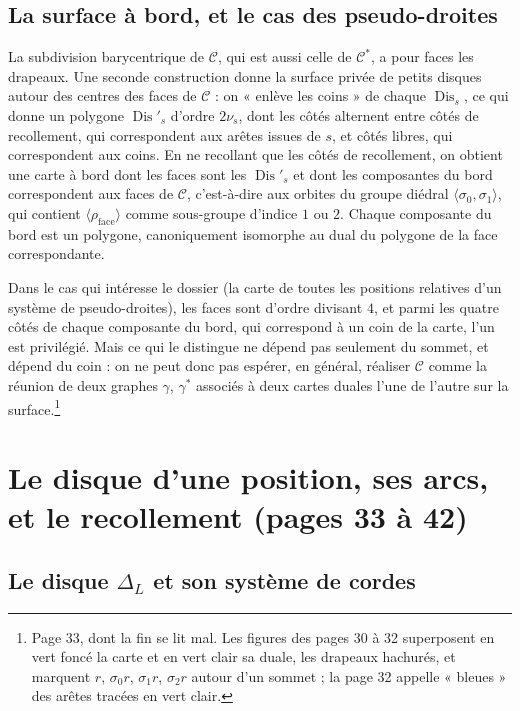 \documentclass[11pt,a4paper]{article}
\begin{document}
\subsection*{La surface à bord, et le cas des pseudo-droites}

La subdivision barycentrique de $\mathcal{C}$, qui est aussi celle de
$\mathcal{C}^{*}$, a pour faces les drapeaux. Une seconde construction donne la
surface privée de petits disques autour des centres des faces de $\mathcal{C}$ :
on « enlève les coins » de chaque $\operatorname{Dis}_s$, ce qui donne un
polygone $\operatorname{Dis}'_s$ d'ordre $2\nu_s$, dont les côtés alternent
entre côtés de recollement, qui correspondent aux arêtes issues de $s$, et côtés
libres, qui correspondent aux coins. En ne recollant que les côtés de
recollement, on obtient une carte à bord dont les faces sont les
$\operatorname{Dis}'_s$ et dont les composantes du bord correspondent aux faces
de $\mathcal{C}$, c'est-à-dire aux orbites du groupe diédral $\langle \sigma_0,
\sigma_1 \rangle$, qui contient $\langle \rho_{\mathrm{face}} \rangle$ comme
sous-groupe d'indice $1$ ou $2$. Chaque composante du bord est un polygone,
canoniquement isomorphe au dual du polygone de la face correspondante.

Dans le cas qui intéresse le dossier (la carte de toutes les positions
relatives d'un système de pseudo-droites), les faces
 sont d'ordre divisant
$4$, et parmi les quatre côtés de chaque composante du bord, qui correspond à un
coin de la carte, l'un est privilégié. Mais ce qui le distingue ne dépend pas
seulement du sommet, et dépend du coin : on ne peut donc pas espérer, en
général, réaliser $\mathcal{C}$ comme la réunion de deux graphes $\gamma$,
$\gamma^{*}$ associés à deux cartes duales l'une de l'autre sur la
surface.\footnote{Page 33, dont la fin se lit mal. Les figures des pages 30 à 32
superposent en vert foncé la carte et en vert clair sa duale, les drapeaux
hachurés, et marquent $r$, $\sigma_0 r$, $\sigma_1 r$, $\sigma_2 r$ autour d'un
sommet ; la page 32 appelle « bleues » des arêtes tracées en vert clair.}

\section*{Le disque d'une position, ses arcs, et le recollement (pages 33 à 42)}

\subsection*{Le disque $\Delta_L$ et son système de cordes}
\end{document}
